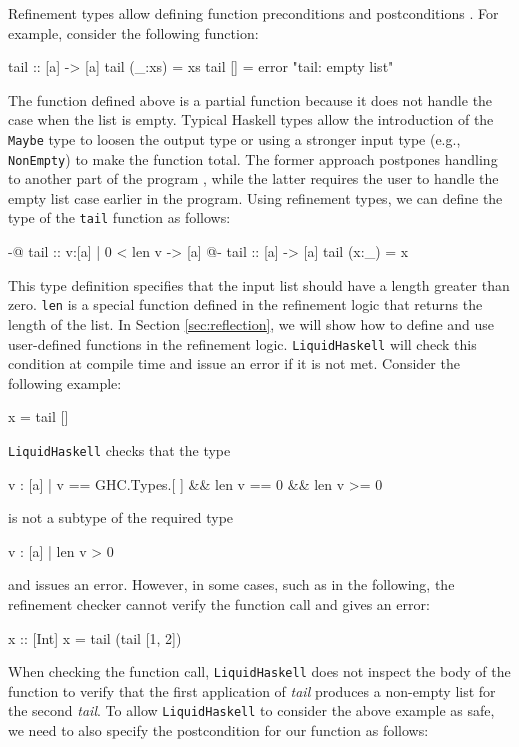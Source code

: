 \documentclass[]{rptuseminar}
\begin{document}
Refinement types allow defining function preconditions and postconditions \cite{jhala_programming_2020}. 
For example, consider the following function:

\begin{haskell}
 tail :: [a] -> [a]
 tail (_:xs) = xs
 tail [] = error "tail: empty list"
\end{haskell}

The function defined above is a partial function because it does not handle the case when the list is empty. 
Typical Haskell types allow the introduction of the \texttt{Maybe} type to loosen the output type or using a stronger input type (e.g., \texttt{NonEmpty}) to make the function total.  
The former approach postpones handling to another part of the program \cite{jhala_programming_2020}, while the latter requires the user to handle the empty list case earlier in the program.
Using refinement types, we can define the type of the \texttt{tail} function as follows:

\begin{haskell}
{-@ tail :: {v:[a] | 0 < len v} -> [a] @-}
 tail :: [a] -> [a]
 tail (x:_) = x
\end{haskell}

This type definition specifies that the input list should have a length greater than zero.
\texttt{len} is a special function defined in the refinement logic that returns the length of the list.
In Section \ref{sec:reflection}, we will show how to define and use user-defined functions in the refinement logic.
\texttt{LiquidHaskell} will check this condition at compile time and issue an error if it is not met.
Consider the following example:
\begin{haskell}
x = tail []
\end{haskell}
\texttt{LiquidHaskell} checks that the type 
\begin{haskell}
{v : [a] | v == GHC.Types.[ ] && len v == 0 && len v >= 0}
\end{haskell}
is not a subtype of the required type 

\begin{haskell}
{v : [a] | len v > 0}
\end{haskell}
and issues an error. However, in some cases, such as in the following, the refinement checker cannot verify the function call and gives an error:
\begin{haskell}
 x :: [Int]
 x = tail (tail [1, 2])
\end{haskell}

When checking the function call, \texttt{LiquidHaskell} does not inspect the body of the function to verify that the first application 
of \textit{tail} produces a non-empty list for the second \textit{tail}.
To allow \texttt{LiquidHaskell} to consider the above example as safe, we need to also specify the postcondition for our function as follows:
\end{document}
